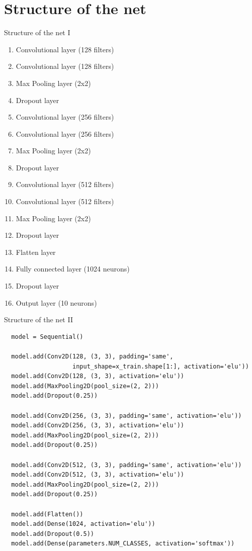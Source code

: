 \documentclass{beamer}
\begin{document}
\section{Structure of the net}

\begin{frame}[fragile]{Structure of the net I}
 \begin{multicols}{2}

  \begin{enumerate}
   \item<+-> Convolutional layer (128 filters)
   \item<+-> Convolutional layer (128 filters)
   \item<+-> Max Pooling layer (2x2)
   \item<+-> Dropout layer
   \item<+-> Convolutional layer (256 filters)
   \item<+-> Convolutional layer (256 filters)
   \item<+-> Max Pooling layer (2x2)
   \item<+-> Dropout layer
   \item<+-> Convolutional layer (512 filters)
   \item<+-> Convolutional layer (512 filters)
   \item<+-> Max Pooling layer (2x2)
   \item<+-> Dropout layer
   \item<+-> Flatten layer
   \item<+-> Fully connected layer (1024 neurons)
   \item<+-> Dropout layer
   \item<+-> Output layer (10 neurons)
  \end{enumerate}
 \end{multicols}


\end{frame}

\begin{frame}[fragile]{Structure of the net II}
 \begin{verbatim}
  model = Sequential()

  model.add(Conv2D(128, (3, 3), padding='same',
                   input_shape=x_train.shape[1:], activation='elu'))
  model.add(Conv2D(128, (3, 3), activation='elu'))
  model.add(MaxPooling2D(pool_size=(2, 2)))
  model.add(Dropout(0.25))

  model.add(Conv2D(256, (3, 3), padding='same', activation='elu'))
  model.add(Conv2D(256, (3, 3), activation='elu'))
  model.add(MaxPooling2D(pool_size=(2, 2)))
  model.add(Dropout(0.25))

  model.add(Conv2D(512, (3, 3), padding='same', activation='elu'))
  model.add(Conv2D(512, (3, 3), activation='elu'))
  model.add(MaxPooling2D(pool_size=(2, 2)))
  model.add(Dropout(0.25))

  model.add(Flatten())
  model.add(Dense(1024, activation='elu'))
  model.add(Dropout(0.5))
  model.add(Dense(parameters.NUM_CLASSES, activation='softmax'))

  \end{verbatim}
\end{frame}
\end{document}
